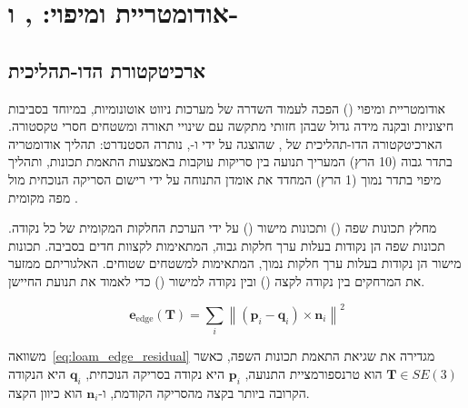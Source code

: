 

\section{אודומטריית  ומיפוי: ,  ו-}
\label{sec:algorithm}

\subsection{ארכיטקטורת  הדו-תהליכית}
\label{subsec:loam_arch}

אודומטריית  ומיפוי () הפכה לעמוד השדרה של
מערכות ניווט אוטונומיות, במיוחד בסביבות חיצוניות ובקנה מידה גדול
שבהן  חזותי מתקשה עם שינויי תאורה ומשטחים חסרי טקסטורה.
הארכיטקטורה הדו-תהליכית של , שהוצגה על ידי 
ו-, נותרה הסטנדרט: תהליך אודומטריה בתדר גבוה (10 הרץ)
המעריך תנועה בין סריקות עוקבות באמצעות התאמת תכונות, ותהליך
מיפוי בתדר נמוך (1 הרץ) המחדד את אומדן התנוחה על ידי רישום
הסריקה הנוכחית מול מפה מקומית \cite{Thrun2005ProbRobotics}.

 מחלץ תכונות שפה () ותכונות מישור
() על ידי הערכת החלקות המקומית של כל נקודה.
תכונות שפה הן נקודות בעלות ערך חלקות גבוה, המתאימות לקצוות חדים
בסביבה. תכונות מישור הן נקודות בעלות ערך חלקות נמוך, המתאימות
למשטחים שטוחים. האלגוריתם ממזער את המרחקים בין נקודה לקצה
() ובין נקודה למישור ()
כדי לאמוד את תנועת החיישן.

\begin{equation}
    \mathbf{e}_{\text{edge}}(\mathbf{T}) = \sum_{i} \left\| \left( \mathbf{p}_i - \mathbf{q}_i \right) \times \mathbf{n}_i \right\|^2
    \label{eq:loam_edge_residual}
\end{equation}

משוואה~\ref{eq:loam_edge_residual} מגדירה את שגיאת התאמת
תכונות השפה, כאשר $\mathbf{T} \in SE(3)$ הוא טרנספורמציית
התנועה, $\mathbf{p}_i$ היא נקודה בסריקה הנוכחית, $\mathbf{q}_i$
היא הנקודה הקרובה ביותר בקצה מהסריקה הקודמת, ו-$\mathbf{n}_i$
הוא כיוון הקצה.

